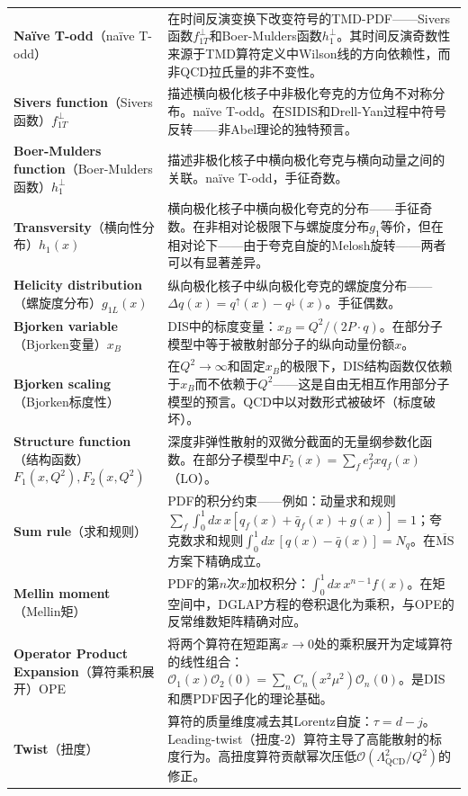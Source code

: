 \documentclass[12pt,a4paper]{ctexart}
\begin{document}
\begin{longtable}{p{3.5cm}p{9cm}}
\textbf{Na\"ive T-odd}（na\"ive T-odd）& 在时间反演变换下改变符号的TMD-PDF——Sivers函数$f_{1T}^\perp$和Boer-Mulders函数$h_1^\perp$。其时间反演奇数性来源于TMD算符定义中Wilson线的方向依赖性，而非QCD拉氏量的非不变性。\\
\textbf{Sivers function}（Sivers函数）$f_{1T}^\perp$& 描述横向极化核子中非极化夸克的方位角不对称分布。na\"ive T-odd。在SIDIS和Drell-Yan过程中符号反转——非Abel理论的独特预言。\\
\textbf{Boer-Mulders function}（Boer-Mulders函数）$h_1^\perp$& 描述非极化核子中横向极化夸克与横向动量之间的关联。na\"ive T-odd，手征奇数。\\
\textbf{Transversity}（横向性分布）$h_1(x)$& 横向极化核子中横向极化夸克的分布——手征奇数。在非相对论极限下与螺旋度分布$g_1$等价，但在相对论下——由于夸克自旋的Melosh旋转——两者可以有显著差异。\\
\textbf{Helicity distribution}（螺旋度分布）$g_{1L}(x)$& 纵向极化核子中纵向极化夸克的螺旋度分布——$\Delta q(x) = q^\uparrow(x) - q^\downarrow(x)$。手征偶数。\\
\textbf{Bjorken variable}（Bjorken变量）$x_B$& DIS中的标度变量：$x_B = Q^2/(2P\cdot q)$。在部分子模型中等于被散射部分子的纵向动量份额$x$。\\
\textbf{Bjorken scaling}（Bjorken标度性）& 在$Q^2\to\infty$和固定$x_B$的极限下，DIS结构函数仅依赖于$x_B$而不依赖于$Q^2$——这是自由无相互作用部分子模型的预言。QCD中以对数形式被破坏（标度破坏）。\\
\textbf{Structure function}（结构函数）$F_1(x,Q^2), F_2(x,Q^2)$& 深度非弹性散射的双微分截面的无量纲参数化函数。在部分子模型中$F_2(x) = \sum_f e_f^2 x q_f(x)$（LO）。\\
\textbf{Sum rule}（求和规则）& PDF的积分约束——例如：动量求和规则$\sum_f\int_0^1 dx\,x[q_f(x)+\bar q_f(x)+g(x)] = 1$；夸克数求和规则$\int_0^1 dx\,[q(x)-\bar q(x)] = N_q$。在$\overline{\text{MS}}$方案下精确成立。\\
\textbf{Mellin moment}（Mellin矩）& PDF的第$n$次$x$加权积分：$\int_0^1 dx\,x^{n-1}f(x)$。在矩空间中，DGLAP方程的卷积退化为乘积，与OPE的反常维数矩阵精确对应。\\
\textbf{Operator Product Expansion}（算符乘积展开）OPE& 将两个算符在短距离$x\to 0$处的乘积展开为定域算符的线性组合：$\mathcal{O}_1(x)\mathcal{O}_2(0) = \sum_n C_n(x^2\mu^2) \mathcal{O}_n(0)$。是DIS和赝PDF因子化的理论基础。\\
\textbf{Twist}（扭度）& 算符的质量维度减去其Lorentz自旋：$\tau = d - j$。Leading-twist（扭度-2）算符主导了高能散射的标度行为。高扭度算符贡献幂次压低$\mathcal{O}(\Lambda_{\text{QCD}}^2/Q^2)$的修正。\\
\bottomrule
\end{longtable}
\end{document}
